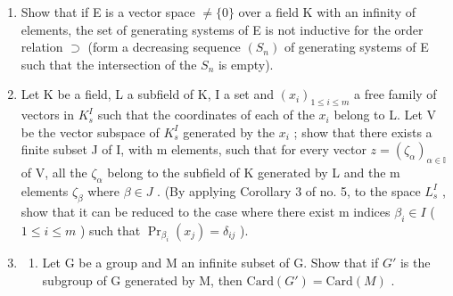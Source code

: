 \BourbakiExercisesSection

\begin{enumerate}
\def\labelenumi{\arabic{enumi}.}
\item
  Show that if E is a vector space \(\neq\{0\}\) over a field K with an infinity of elements, the set of generating systems of E is not inductive for the order relation \(\supset\) (form a decreasing sequence \((S_{n})\) of generating systems of E such that the intersection of the \(S_{n}\) is empty).
\item
  Let K be a field, L a subfield of K, I a set and \((x_{i})_{1\leqslant i\leqslant m}\) a free family of vectors in \(K_{s}^{I}\) such that the coordinates of each of the \(x_{i}\) belong to L. Let V be the vector subspace of \(K_{s}^{I}\) generated by the \(x_{i}\) ; show that there exists a finite subset J of I, with m elements, such that for every vector \(z=(\zeta_{\alpha})_{\alpha\in\mathbb{I}}\) of V, all the \(\zeta_{\alpha}\) belong to the subfield of K generated by L and the m elements \(\zeta_{\beta}\) where \(\beta\in J\) . (By applying Corollary 3 of no. 5, to the space \(L_{s}^{I}\) , show that it can be reduced to the case where there exist m indices \(\beta_{i}\in I\) ( \(1\leqslant i\leqslant m\) ) such that \(\Pr_{\beta_{i}}(x_{j})=\delta_{ij}\) ).
\item
  \begin{enumerate}
  \def\labelenumii{(\alph{enumii})}
  \tightlist
  \item
    Let G be a group and M an infinite subset of G. Show that if \(G'\) is the subgroup of G generated by M, then \(\text{Card}(G') = \text{Card}(M)\) .
  \end{enumerate}
\end{enumerate}

